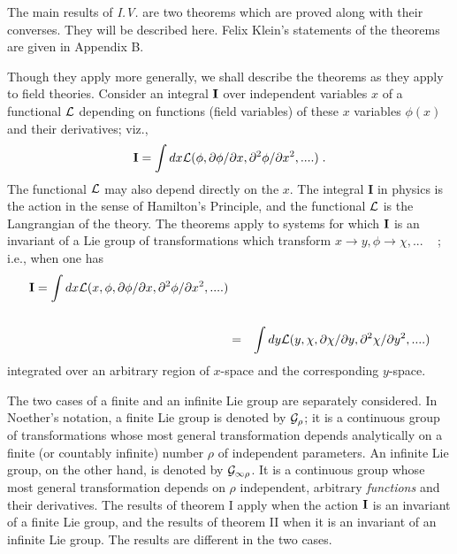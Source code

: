The main results of {\it{I.V.}} are two theorems which are proved along
with their converses.
  They
will be described here. Felix Klein's statements \cite{basil} of the theorems
 are given  in Appendix B. 

Though they apply more generally, we shall describe the
theorems as they apply to field theories. Consider an integral
${\bf{I}}$
over independent variables $x$ of a functional $\cal{L}$ depending on
functions (field variables) of these $x$ variables $\phi(x)$ and  their derivatives; viz.,
\begin{equation}
{\bf{I}} = \int dx {\cal{L}}( \phi, \partial \phi/ \partial x, \partial^2 \phi/
\partial x ^2, ....) \; .                                                          
\end{equation}
 The
functional $\cal{L}$ may also depend directly on the $x$.
 The integral
 {\bf{I}} in physics 
is the action in the sense of Hamilton's Principle, 
and the functional  $\cal{L}$ is the Langrangian  of the theory.
The theorems apply to systems for which ${\bf{I}}$ is an invariant 
of a Lie group of transformations which transform $x \rightarrow y,
\phi \rightarrow \chi, ... $ ~ ; i.e., when one has
\begin{eqnarray}
{\bf{I}} =  \int dx {\cal{L}}(x, \phi, \partial \phi/ \partial x, \partial^2 \phi/
\partial x ^2, ....)   \nonumber                  \\
& & \\
& = & \int dy {\cal{L}}(y, \chi, \partial \chi/ \partial y, \partial^2 \chi/
\partial y^2, ....) \nonumber
\end{eqnarray}
integrated over an arbitrary region of $x$-space and the corresponding
$y$-space.

The two cases of a finite and an infinite Lie group are separately considered.
In Noether's notation,   a finite Lie group is denoted by $\cal{G}_\rho$; it is a continuous group  of transformations
whose most general transformation depends analytically on a 
finite (or countably infinite) number $\rho$ of independent 
parameters. An infinite Lie group, on the other hand, is denoted by 
$\cal{G}_{\infty\rho}$. It 
is a continuous group 
whose most general transformation depends on $\rho$ independent, arbitrary
 {\it{functions}} and their derivatives.  The results of theorem I  apply when the action ${\bf{I}}$
is an invariant 
 of a finite Lie group, and the results of theorem II when it is an invariant of
an infinite Lie group. The results are different in the two cases.
                                                    
